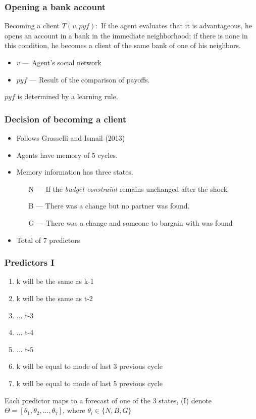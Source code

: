 \begin{frame}
    \frametitle{Opening a bank account}
    \begin{block}{Becoming a client}
        $T(v, pyf):$ If the agent evaluates that it is advantageous,
        he opens an account in a bank in the immediate neighborhood; 
        if there is none in this condition, he becomes a client of the same bank of one of his neighbors. 
    \end{block}
    \begin{itemize}
        \item $v$ --- Agent's social network
        \item $pyf$ --- Result of the comparison of payoffs.
    \end{itemize}

    $pyf$ is determined by a learning rule.
\end{frame}

\begin{frame}
    \frametitle{Decision of becoming a client}

    \begin{itemize}
        \item Follows Grasselli and Ismail (2013)
        \item Agents have memory of 5 cycles.
        \item Memory information has three states.
        \begin{itemize}
            \item[N] --- If the \emph{budget constraint} remains unchanged after the shock 
            \item[B] --- There was a change but no partner was found.
            \item[G] --- There was a change and someone to bargain with was found
        \end{itemize}
        \item Total of 7 predictors
    \end{itemize}
\end{frame}

\begin{frame}
    \frametitle{Predictors I}
    \begin{enumerate}
        \item k will be the same as k-1
        \item k will be the same as t-2
        \item ... t-3
        \item ... t-4
        \item ... t-5
        \item k will be equal to mode of last 3 previous cycle
        \item k will be equal to mode of last 5 previous cycle
    \end{enumerate}

    Each predictor maps to a forecast of one of the 3 states, 
    (I) denote $\Theta = [\theta_1, \theta_2, \dots, \theta_7]$, where $\theta_i \in \{N,B,G\}$
\end{frame}

